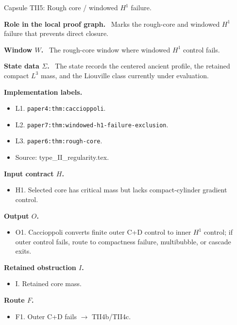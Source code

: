 \documentclass[11pt]{amsart}
\newcommand{\capsulefield}[1]{\par\smallskip\noindent\textbf{#1.}\ }
\begin{document}
\begin{proofcapsule}{Capsule TII5: Rough core / windowed $H^1$ failure.}
  \capsulefield{Role in the local proof graph}
  Marks the rough-core and windowed \(H^1\) failure that prevents direct closure.

  \capsulefield{Window \(W\)}
The rough-core window where windowed $H^1$ control fails.

  \capsulefield{State data \(\Sigma\)}
The state records the centered ancient profile, the retained compact $L^3$ mass, and the Liouville class currently under evaluation.

  \capsulefield{Implementation labels}
  \begin{itemize}[leftmargin=1.8em]
  \item L1. \texttt{paper4:thm:caccioppoli}.
  \item L2. \texttt{paper7:thm:windowed-h1-failure-exclusion}.
  \item L3. \texttt{paper6:thm:rough-core}.
  \item Source: type\_II\_regularity.tex.
  \end{itemize}

  \capsulefield{Input contract \(H\)}
  \begin{itemize}[leftmargin=1.8em]
  \item H1. Selected core has critical mass but lacks compact-cylinder gradient control.
  \end{itemize}

  \capsulefield{Output \(O\)}
  \begin{itemize}[leftmargin=1.8em]
  \item O1. Caccioppoli converts finite outer C+D control to inner $H^1$ control; if outer control fails, route to compactness failure, multibubble, or cascade exits.
  \end{itemize}

  \capsulefield{Retained obstruction \(I\)}
  \begin{itemize}[leftmargin=1.8em]
  \item I. Retained core mass.
  \end{itemize}

  \capsulefield{Route \(F\)}
  \begin{itemize}[leftmargin=1.8em]
  \item F1. Outer C+D fails $\to$ TII4b/TII4c.
  \end{itemize}


\end{proofcapsule}
\end{document}
